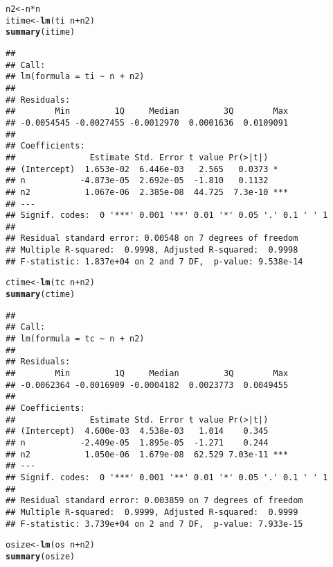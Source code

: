 \documentclass[10pt]{article}\usepackage[]{graphicx}\usepackage[]{color}
\makeatletter
\newcommand{\hlopt}[1]{\textcolor[rgb]{0,0,0}{#1}}%
\newcommand{\hlstd}[1]{\textcolor[rgb]{0.345,0.345,0.345}{#1}}%
\newcommand{\hlkwb}[1]{\textcolor[rgb]{0.69,0.353,0.396}{#1}}%
\newcommand{\hlkwd}[1]{\textcolor[rgb]{0.737,0.353,0.396}{\textbf{#1}}}%
\newenvironment{kframe}{%
 \def\at@end@of@kframe{}%
 \ifinner\ifhmode%
  \def\at@end@of@kframe{\end{minipage}}%
  \begin{minipage}{\columnwidth}%
 \fi\fi%
 \def\FrameCommand##1{\hskip\@totalleftmargin \hskip-\fboxsep
 \colorbox{shadecolor}{##1}\hskip-\fboxsep
     \hskip-\linewidth \hskip-\@totalleftmargin \hskip\columnwidth}%
 \MakeFramed {\advance\hsize-\width
   \@totalleftmargin\z@ \linewidth\hsize
   \@setminipage}}%
 {\par\unskip\endMakeFramed%
 \at@end@of@kframe}
\newenvironment{knitrout}{}{} %
\makeatother
\begin{document}
\begin{knitrout}\scriptsize
{}\color{fgcolor}\begin{kframe}
\begin{alltt}
\hlstd{n2}\hlkwb{<-}\hlstd{n}\hlopt{*}\hlstd{n}
\hlstd{itime}\hlkwb{<-}\hlkwd{lm}\hlstd{(ti}\hlopt{~}\hlstd{n}\hlopt{+}\hlstd{n2)}
\hlkwd{summary}\hlstd{(itime)}
\end{alltt}
\begin{verbatim}
## 
## Call:
## lm(formula = ti ~ n + n2)
## 
## Residuals:
##        Min         1Q     Median         3Q        Max 
## -0.0054545 -0.0027455 -0.0012970  0.0001636  0.0109091 
## 
## Coefficients:
##               Estimate Std. Error t value Pr(>|t|)    
## (Intercept)  1.653e-02  6.446e-03   2.565   0.0373 *  
## n           -4.873e-05  2.692e-05  -1.810   0.1132    
## n2           1.067e-06  2.385e-08  44.725  7.3e-10 ***
## ---
## Signif. codes:  0 '***' 0.001 '**' 0.01 '*' 0.05 '.' 0.1 ' ' 1
## 
## Residual standard error: 0.00548 on 7 degrees of freedom
## Multiple R-squared:  0.9998,	Adjusted R-squared:  0.9998 
## F-statistic: 1.837e+04 on 2 and 7 DF,  p-value: 9.538e-14
\end{verbatim}
\begin{alltt}
\hlstd{ctime}\hlkwb{<-}\hlkwd{lm}\hlstd{(tc}\hlopt{~}\hlstd{n}\hlopt{+}\hlstd{n2)}
\hlkwd{summary}\hlstd{(ctime)}
\end{alltt}
\begin{verbatim}
## 
## Call:
## lm(formula = tc ~ n + n2)
## 
## Residuals:
##        Min         1Q     Median         3Q        Max 
## -0.0062364 -0.0016909 -0.0004182  0.0023773  0.0049455 
## 
## Coefficients:
##               Estimate Std. Error t value Pr(>|t|)    
## (Intercept)  4.600e-03  4.538e-03   1.014    0.345    
## n           -2.409e-05  1.895e-05  -1.271    0.244    
## n2           1.050e-06  1.679e-08  62.529 7.03e-11 ***
## ---
## Signif. codes:  0 '***' 0.001 '**' 0.01 '*' 0.05 '.' 0.1 ' ' 1
## 
## Residual standard error: 0.003859 on 7 degrees of freedom
## Multiple R-squared:  0.9999,	Adjusted R-squared:  0.9999 
## F-statistic: 3.739e+04 on 2 and 7 DF,  p-value: 7.933e-15
\end{verbatim}
\begin{alltt}
\hlstd{osize}\hlkwb{<-}\hlkwd{lm}\hlstd{(os}\hlopt{~}\hlstd{n}\hlopt{+}\hlstd{n2)}
\hlkwd{summary}\hlstd{(osize)}
\end{alltt}



\end{kframe}
\end{knitrout}
\end{document}
